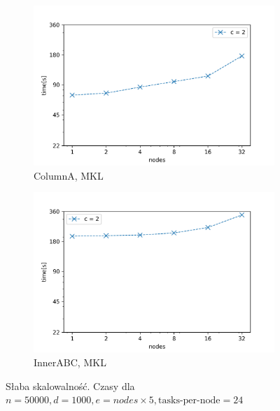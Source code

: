 \documentclass{article}
\begin{document}
\begin{figure}[ht!]
    \centering
    \begin{subfigure}[b]{0.45\textwidth}
        \includegraphics[width=\textwidth]{charts/s_50000_1000_weak_m}
        \caption{ColumnA, MKL}
    \end{subfigure}
    \begin{subfigure}[b]{0.45\textwidth}
        \includegraphics[width=\textwidth]{charts/s_50000_1000_weak_i_m}
        \caption{InnerABC, MKL}
    \end{subfigure}
    \caption{Słaba skalowalność. Czasy dla $n=50000, d=1000, e=nodes \times 5, \text{tasks-per-node}=24$}\label{fig:animals}
    \label{fig:scal_weak}
\end{figure}
\end{document}
